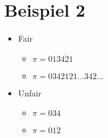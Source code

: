 \documentclass[12pt,a4paper]{article}
\begin{document}
\section{Beispiel 2}

\begin{itemize}
	\item Fair
	\begin{itemize}
		\item $\pi = 01\overline{3421}$
		\item $\pi = 0342121 \ldots 342 \ldots$
	\end{itemize}
	\item Unfair
	\begin{itemize}
		\item $\pi = 03\dot{4}$
		\item $\pi = 0\overline{12}$
	\end{itemize}
\end{itemize}	
	
\end{document}
